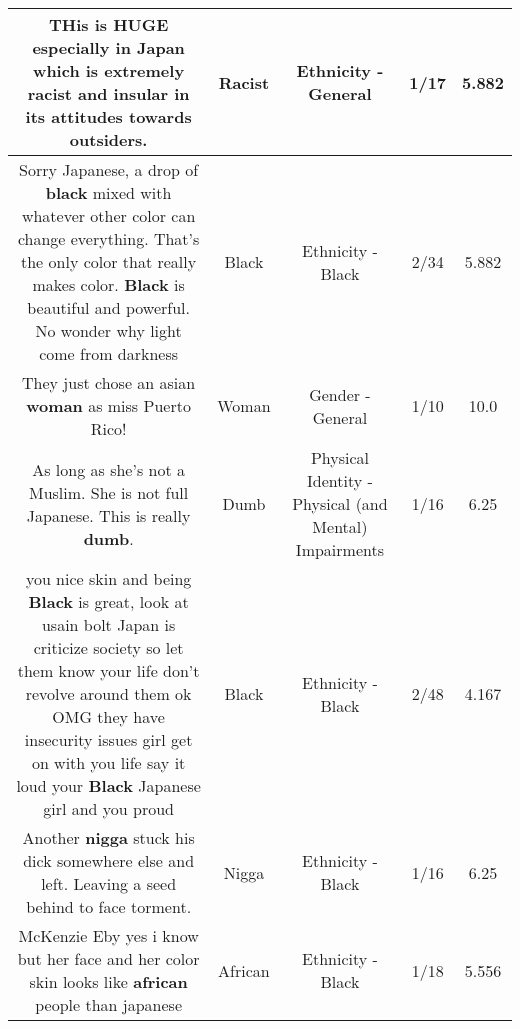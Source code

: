 \documentclass[11pt]{article}
\newlength\mylength
\begin{document}
\begin{center}
\begin{longtable}{|C{.65\mylength}|C{.30\mylength}|C{.12\mylength}|C{.12\mylength}|C{.12\mylength}|}
  \small THis is HUGE especially in Japan which is extremely \textbf{racist} and insular  in its attitudes towards outsiders.\normalsize   & Racist & Ethnicity - General & 1/17 & 5.882 \\  \hline
  \small Sorry Japanese, a drop of \textbf{black}  mixed with whatever other color can change everything.  That's the only color that really makes color.  \textbf{Black} is beautiful and powerful. No wonder why light come from darkness\normalsize   & Black & Ethnicity - Black & 2/34 & 5.882 \\  \hline
  \small They just chose an asian \textbf{woman} as miss Puerto Rico!\normalsize   & Woman & Gender - General & 1/10 & 10.0 \\  \hline
  \small As long as she's not a Muslim. She is not full Japanese. This is really \textbf{dumb}.\normalsize   & Dumb & Physical Identity - Physical (and Mental) Impairments & 1/16 & 6.25 \\  \hline
  \small you nice skin and being \textbf{Black} is great,  look at usain bolt Japan  is  criticize society so let  them know your life don't revolve around them  ok OMG  they have insecurity issues girl get on with you life  say it loud your  \textbf{Black} Japanese girl  and you proud\normalsize   & Black & Ethnicity - Black & 2/48 & 4.167 \\  \hline
  \small Another \textbf{nigga} stuck his dick somewhere else and left. Leaving a seed behind to face torment.\normalsize   & Nigga & Ethnicity - Black & 1/16 & 6.25 \\  \hline
  \small McKenzie Eby  yes i know but her face and her color skin looks like \textbf{african} people than japanese\normalsize   & African & Ethnicity - Black & 1/18 & 5.556 \\  \hline

\end{longtable}
\end{center}
\end{document}
